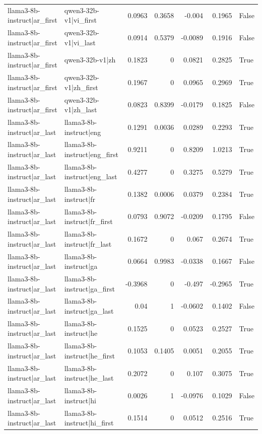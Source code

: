 \begin{table}
\begin{tabular}{l l r r r r l}
llama3-8b-instruct|ar_first & qwen3-32b-v1|vi_first & 0.0963 & 0.3658 & -0.004 & 0.1965 & False \\
llama3-8b-instruct|ar_first & qwen3-32b-v1|vi_last & 0.0914 & 0.5379 & -0.0089 & 0.1916 & False \\
llama3-8b-instruct|ar_first & qwen3-32b-v1|zh & 0.1823 & 0 & 0.0821 & 0.2825 & True \\
llama3-8b-instruct|ar_first & qwen3-32b-v1|zh_first & 0.1967 & 0 & 0.0965 & 0.2969 & True \\
llama3-8b-instruct|ar_first & qwen3-32b-v1|zh_last & 0.0823 & 0.8399 & -0.0179 & 0.1825 & False \\
llama3-8b-instruct|ar_last & llama3-8b-instruct|eng & 0.1291 & 0.0036 & 0.0289 & 0.2293 & True \\
llama3-8b-instruct|ar_last & llama3-8b-instruct|eng_first & 0.9211 & 0 & 0.8209 & 1.0213 & True \\
llama3-8b-instruct|ar_last & llama3-8b-instruct|eng_last & 0.4277 & 0 & 0.3275 & 0.5279 & True \\
llama3-8b-instruct|ar_last & llama3-8b-instruct|fr & 0.1382 & 0.0006 & 0.0379 & 0.2384 & True \\
llama3-8b-instruct|ar_last & llama3-8b-instruct|fr_first & 0.0793 & 0.9072 & -0.0209 & 0.1795 & False \\
llama3-8b-instruct|ar_last & llama3-8b-instruct|fr_last & 0.1672 & 0 & 0.067 & 0.2674 & True \\
llama3-8b-instruct|ar_last & llama3-8b-instruct|ga & 0.0664 & 0.9983 & -0.0338 & 0.1667 & False \\
llama3-8b-instruct|ar_last & llama3-8b-instruct|ga_first & -0.3968 & 0 & -0.497 & -0.2965 & True \\
llama3-8b-instruct|ar_last & llama3-8b-instruct|ga_last & 0.04 & 1 & -0.0602 & 0.1402 & False \\
llama3-8b-instruct|ar_last & llama3-8b-instruct|he & 0.1525 & 0 & 0.0523 & 0.2527 & True \\
llama3-8b-instruct|ar_last & llama3-8b-instruct|he_first & 0.1053 & 0.1405 & 0.0051 & 0.2055 & True \\
llama3-8b-instruct|ar_last & llama3-8b-instruct|he_last & 0.2072 & 0 & 0.107 & 0.3075 & True \\
llama3-8b-instruct|ar_last & llama3-8b-instruct|hi & 0.0026 & 1 & -0.0976 & 0.1029 & False \\
llama3-8b-instruct|ar_last & llama3-8b-instruct|hi_first & 0.1514 & 0 & 0.0512 & 0.2516 & True \\

\end{tabular}
\end{table}
